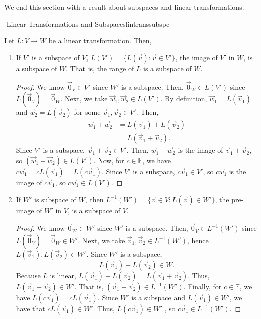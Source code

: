         \pagebreak
        \vphantom
        \\
        \\
        We end this section with a result about subspaces and linear transformations.
        \begin{theorem}{\Stop\,\,Linear Transformations and Subspaces}{lintranssubspc}

            Let \(L:V\to W\) be a linear transformation. Then,
            \begin{enumerate}
                \item If \(V'\) is a subspace of \(V\), \(L(V')=\{L(\vec{v}):\vec{v}\in V'\}\), the image of \(V'\) in \(W\), is a subspace of \(W\). That is, the range of \(L\) is a subspace of \(W\).
                \begin{proof}
                    We know \(\vec{0}_V\in V'\) since \(W'\) is a subspace. Then, \(\vec{0}_W\in L(V')\) since \(L(\vec{0}_V)=\vec{0}_W\). Next, we take \(\vec{w}_1,\vec{w}_2\in L(V')\). By definition, \(\vec{w}_1=L(\vec{v}_1)\) and \(\vec{w}_2=L(\vec{v}_2)\) for some \(\vec{v}_1,\vec{v}_2\in V'\). Then,
                    \begin{align*}
                        \vec{w}_1+\vec{w}_2&=L(\vec{v}_1)+L(\vec{v}_2) \\
                        &=L(\vec{v}_1+\vec{v}_2).
                    \end{align*}
                    Since \(V'\) is a subspace, \(\vec{v}_1+\vec{v}_2\in V'\). Then, \(\vec{w}_1+\vec{w}_2\) is the image of \(\vec{v}_1+\vec{v}_2\), so \((\vec{w}_1+\vec{w}_2)\in L(V')\). Now, for \(c\in\mathbb{F}\), we have \(c\vec{w}_1=cL(\vec{v}_1)=L(c\vec{v}_1)\). Since \(V'\) is a subspace, \(c\vec{v}_1\in V'\), so \(c\vec{w}_1\) is the image of \(c\vec{v}_1\), so \(c\vec{w}_1\in L(V')\).
                \end{proof}
                \item If \(W'\) is subspace of \(W\), then \(L^{-1}(W')=\{\vec{v}\in V:L(\vec{v})\in W'\}\), the pre-image of \(W'\) in \(V\), is a subspace of \(V\).
                \begin{proof}
                    We know \(\vec{0}_W\in W'\) since \(W'\) is a subspace. Then, \(\vec{0}_V\in L^{-1}(W')\) since \(L(\vec{0}_V)=\vec{0}_W\in W'\). Next, we take \(\vec{v}_1,\vec{v}_2\in L^{-1}(W')\), hence \(L(\vec{v}_1),L(\vec{v}_2)\in W'\). Since \(W'\) is a subspace,
                    \begin{equation*}
                        L(\vec{v}_1)+L(\vec{v}_2)\in W.
                    \end{equation*}
                    Because \(L\) is linear, \(L(\vec{v}_1)+L(\vec{v}_2)=L(\vec{v}_1+\vec{v}_2)\). Thus, \(L(\vec{v}_1+\vec{v}_2)\in W'\). That is, \((\vec{v}_1+\vec{v}_2)\in L^{-1}(W')\). Finally, for \(c\in\mathbb{F}\), we have \(L(c\vec{v}_1)=cL(\vec{v}_1)\). Since \(W'\) is a subspace and \(L(\vec{v}_1)\in W'\), we have that \(cL(\vec{v}_1)\in W'\). Thus, \(L(c\vec{v}_1)\in W'\) , so \(c\vec{v}_1\in L^{-1}(W')\).
                \end{proof}
            \end{enumerate}
            
        \end{theorem}
        \pagebreak
